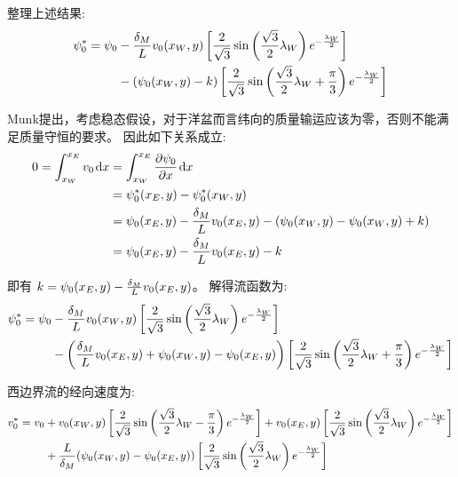 整理上述结果:
\begin{equation*}
\begin{aligned}
    \psi_0^* = \psi_0 &- \frac{\delta_M}{L} v_0(x_W, y) \left[\frac{2}{\sqrt{3}} \sin\left(\frac{\sqrt{3}}{2} \lambda_W\right) e^{-\frac{\lambda_W}{2}}\right] \\
    &- (\psi_0(x_W, y) - k) \left[\frac{2}{\sqrt{3}} \sin\left(\frac{\sqrt{3}}{2} \lambda_W + \frac{\pi}{3}\right) e^{-\frac{\lambda_W}{2}}\right]
\end{aligned}
\end{equation*}

Munk提出，考虑稳态假设，对于洋盆而言纬向的质量输运应该为零，否则不能满足质量守恒的要求。
因此如下关系成立:
\begin{align*}
    0 = \int_{x_W}^{x_E} v_0 \dd{x} &= \int_{x_W}^{x_E} \pde{\streamfunc_0}{x} \dd{x} \\
    &= \flayer{\streamfunc_0}(x_E, y) - \flayer{\streamfunc_0}(x_W, y) \\
    &= \streamfunc_0(x_E, y) - \frac{\delta_M}{\hscale} v_0(x_E, y) - (\streamfunc_0(x_W, y) - \streamfunc_0(x_W, y) + k) \\
    &= \streamfunc_0(x_E, y) - \frac{\delta_M}{\hscale} v_0(x_E, y) - k
\end{align*}

即有 $k = \psi_0(x_E, y) - \frac{\delta_M}{L} v_0(x_E, y)$。
解得流函数为:
\begin{equation}
\begin{aligned}
    \psi_0^* = \psi_0 &- \frac{\delta_M}{L} v_0(x_W, y) \left[\frac{2}{\sqrt{3}} \sin\left(\frac{\sqrt{3}}{2} \lambda_W\right) e^{-\frac{\lambda_W}{2}}\right] \\
    &- \left(\frac{\delta_M}{L} v_0(x_E, y) + \psi_0(x_W, y) - \psi_0(x_E, y)\right) \left[\frac{2}{\sqrt{3}} \sin\left(\frac{\sqrt{3}}{2} \lambda_W + \frac{\pi}{3}\right) e^{-\frac{\lambda_W}{2}}\right]
    \label{eq:munk_streamfunc_solution_west}
\end{aligned}
\end{equation}

西边界流的经向速度为:
\begin{equation}
\begin{aligned}
    v_0^* = v_0 &+ v_0(x_W, y) \left[\frac{2}{\sqrt{3}} \sin\left(\frac{\sqrt{3}}{2} \lambda_W - \frac{\pi}{3}\right) e^{-\frac{\lambda_W}{2}}\right] + v_0(x_E, y) \left[\frac{2}{\sqrt{3}} \sin\left(\frac{\sqrt{3}}{2} \lambda_W\right) e^{-\frac{\lambda_W}{2}}\right] \\
    &+ \frac{L}{\delta_M} (\psi_0(x_W, y) - \psi_0(x_E, y)) \left[\frac{2}{\sqrt{3}} \sin\left(\frac{\sqrt{3}}{2} \lambda_W\right) e^{-\frac{\lambda_W}{2}}\right]
    \label{eq:munk_v_solution_west}
\end{aligned}
\end{equation}

